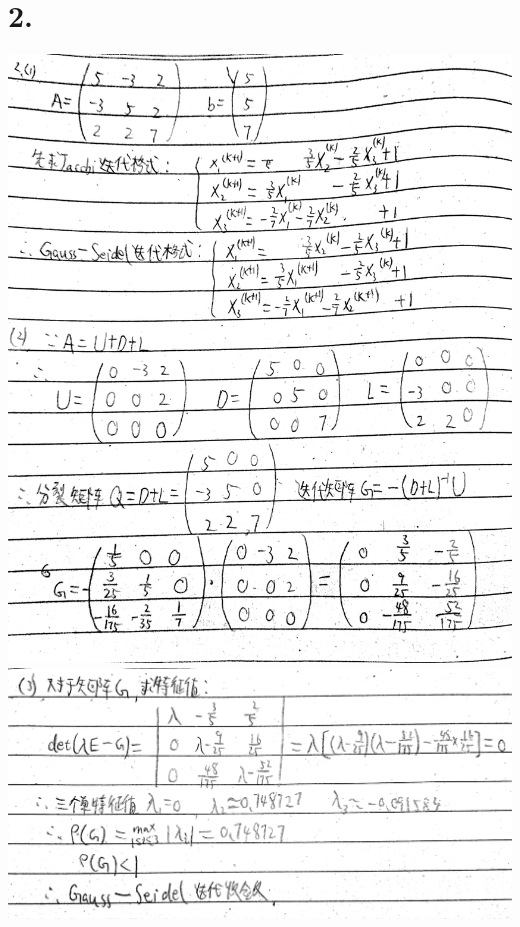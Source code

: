 \documentclass{article}
\begin{document}
	\section*{2.}
	\includegraphics*[scale = 0.12]{2.jpg}\\
	\includegraphics*[scale = 0.12]{3.jpg}
\end{document}
